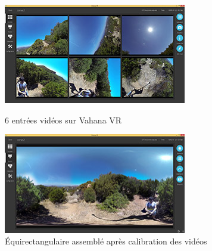 \begin{figure}
  \centering
  \begin{minipage}{0.45\textwidth}
    \centering
    \includegraphics[width=8.0cm]{images/vahana-vr-sources.jpg}
    \caption{6 entrées vidéos sur Vahana VR}
  \end{minipage}%
  \hspace{0.08\textwidth}
  \begin{minipage}{0.45\textwidth}
    \centering
    \includegraphics[width=8.0cm]{images/vahana-vr-output.jpg}
    \caption{Équirectangulaire assemblé après calibration des vidéos}
  \end{minipage}
\end{figure}

